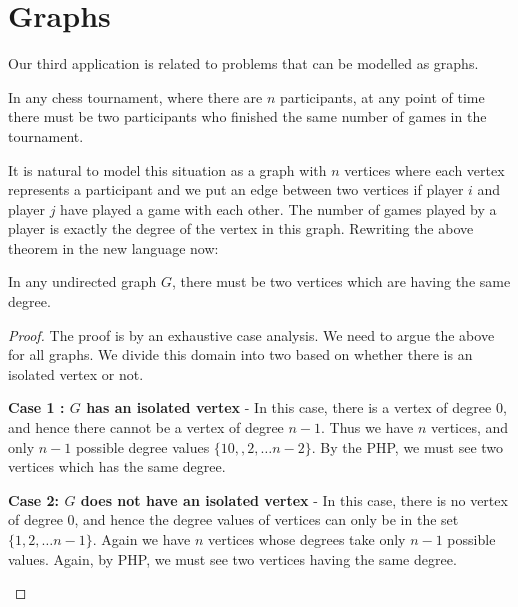 \section{Graphs}

Our third application is related to problems that can be modelled as graphs.

\begin{theorem}
In any chess tournament, where there are $n$ participants, at any point of time there must be two participants who finished the same number of games in the tournament.
\end{theorem}
It is natural to model this situation as a graph with $n$ vertices where each vertex represents a participant and we put an edge between two vertices if player $i$  and player $j$ have played a game with each other. The number of games played by a player is exactly the degree of the vertex in this graph. Rewriting the above theorem in the new language now:
\begin{theorem}
In any undirected graph $G$, there must be two vertices which are having the same degree.
\end{theorem}
\begin{proof}
The proof is by an exhaustive case analysis. We need to argue the above for all graphs. We divide this domain into two based on whether there is an isolated vertex or not.
\begin{description}
\item{\bf Case 1 : $G$ has an isolated vertex} - In this case, there is a vertex of degree $0$, and hence there cannot be a vertex of degree $n-1$. Thus we have $n$ vertices, and only $n-1$ possible degree values $\{10,,2,\ldots n-2\}$. By the PHP, we must see two vertices which has the same degree.
\item{\bf Case 2: $G$ does not have an isolated vertex} - In this case, there is no vertex of degree $0$, and hence the degree values of vertices can only be in the set $\{1, 2, \ldots n-1\}$. Again we have $n$ vertices whose degrees take only $n-1$ possible values. Again, by PHP, we must see two vertices having the same degree.
\end{description}
\end{proof}

